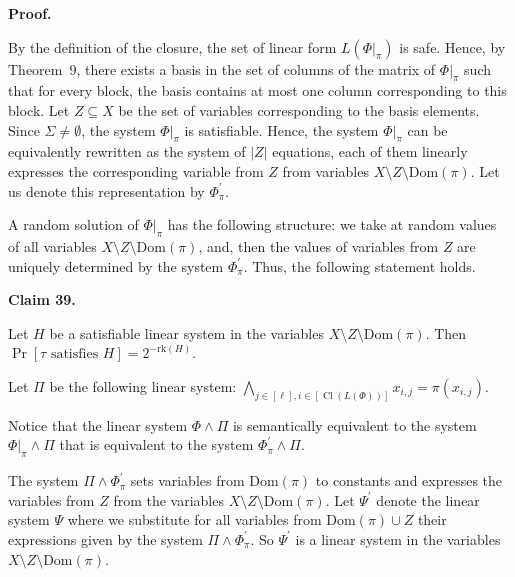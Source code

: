 \documentclass[10pt,a4paper]{article}
\begin{document}
\par\medskip\noindent\textbf{Proof.}\par


By the definition of the closure, the set of linear form
$L(\Phi|_{\pi})$ is safe. Hence, by Theorem 9, there exists a basis in the set of columns of the matrix of $\Phi|_{\pi}$ such that for every block, the basis contains at most one column corresponding to this block. Let $Z\subseteq X$ be the set of variables corresponding to the basis elements. Since $\Sigma\neq\emptyset$, the system $\Phi|_{\pi}$ is satisfiable.
Hence, the system $\Phi|_{\pi}$ can be equivalently rewritten as the system of $|Z|$ equations, each of them linearly expresses the corresponding variable from $Z$ from variables $X\setminus Z\setminus\mathrm{Dom}(\pi)$. Let us denote this representation by $\Phi_{\pi}^{\prime}$.\par



A random solution of $\Phi|_{\pi}$ has the following structure: we take at random values of all variables $X\setminus Z\setminus\mathrm{Dom}(\pi)$, and, then the values of
variables from $Z$ are uniquely determined by the system $\Phi_{\pi}^{\prime}$. Thus, the following statement holds.\par



\par\medskip\noindent\textbf{
Claim 39. 
}\par



Let $H$ be a satisfiable linear system in the variables $X\setminus Z\setminus\mathrm{Dom}(\pi)$. Then $\Pr[\tau\mbox{ satisfies }H]=2^{-\mathrm{rk}(H)}$.\par




Let $\Pi$ be the following linear system:
$\bigwedge_{j\in[\ell],i\in[\mathop{\mathrm{Cl}}(L(\Phi))]}x_{i,j}=\pi(x_{i,j})$.\par



Notice that the linear system $\Phi\land\Pi$ is semantically equivalent to the system $\Phi|_{\pi}\land\Pi$ that is equivalent to the system $\Phi^{\prime}_{\pi}\land\Pi$.\par



The system $\Pi\land\Phi_{\pi}^{\prime}$ sets variables from $\mathrm{Dom}(\pi)$ to constants and expresses the variables from $Z$ from the variables $X\setminus Z\setminus\mathrm{Dom}(\pi)$. Let $\Psi^{\prime}$ denote the linear system $\Psi$ where we
substitute for all variables from $\mathrm{Dom}(\pi)\cup Z$ their expressions given by the system $\Pi\land\Phi_{\pi}^{\prime}$. So $\Psi^{\prime}$ is a linear system in the variables $X\setminus Z\setminus\mathrm{Dom}(\pi)$.\par
\end{document}
